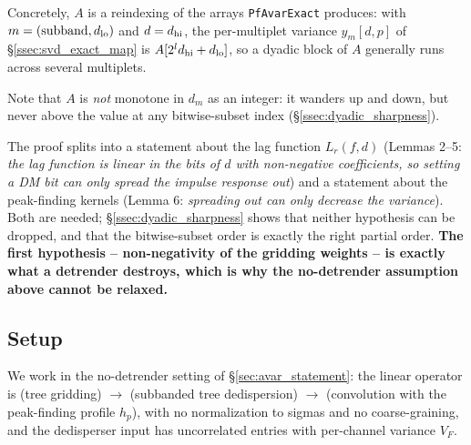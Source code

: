 \documentclass{article}
\numberwithin{equation}{section}   %
\begin{document}
Concretely, $A$ is a reindexing of the arrays {\tt PfAvarExact} produces: with
$m = (\mbox{subband}, d_{\rm lo})$ and $d = d_{\rm hi}$, the per-multiplet variance
$y_m[d,p]$ of \S\ref{ssec:svd_exact_map} is $A[2^l d_{\rm hi} + d_{\rm lo}]$, so a dyadic
block of $A$ generally runs across several multiplets.

Note that $A$ is {\em not} monotone in $d_m$ as an integer: it wanders up and down, but never
above the value at any bitwise-subset index (\S\ref{ssec:dyadic_sharpness}).

The proof splits into a statement about the lag function $L_r(f,d)$ (Lemmas 2--5: {\em the
lag function is linear in the bits of $d$ with non-negative coefficients, so setting a DM bit
can only spread the impulse response out}) and a statement about the peak-finding kernels
(Lemma 6: {\em spreading out can only decrease the variance}). Both are needed;
\S\ref{ssec:dyadic_sharpness} shows that neither hypothesis can be dropped, and that the
bitwise-subset order is exactly the right partial order. {\bf The first hypothesis --
non-negativity of the gridding weights -- is exactly what a detrender destroys, which is
why the no-detrender assumption above cannot be relaxed.}

\subsection{Setup}
\label{ssec:dyadic_setup}

We work in the no-detrender setting of \S\ref{sec:avar_statement}: the linear operator is
(tree gridding) $\to$ (subbanded tree dedispersion) $\to$ (convolution with the peak-finding
profile $h_p$), with no normalization to sigmas and no coarse-graining, and the dedisperser
input has uncorrelated entries with per-channel variance $V_F$.
\end{document}
